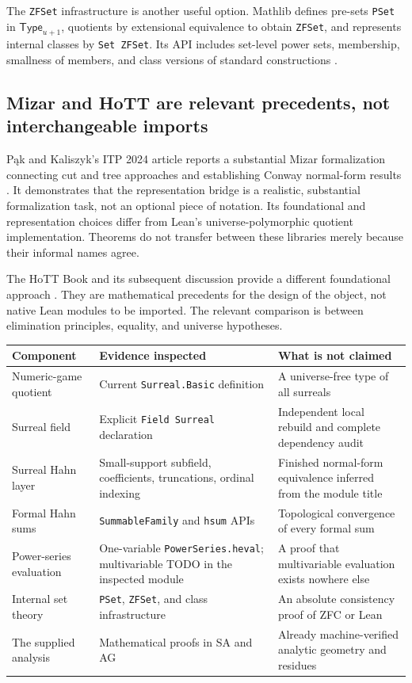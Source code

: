 \documentclass[11pt,letterpaper]{article}
\theoremstyle{definition}
\theoremstyle{remark}
\newcommand{\Type}{\mathsf{Type}}
\numberwithin{equation}{section}
\begin{document}
The \texttt{ZFSet} infrastructure is another useful option. Mathlib defines pre-sets \texttt{PSet} in \(\Type_{u+1}\), quotients by extensional equivalence to obtain \texttt{ZFSet}, and represents internal classes by \texttt{Set ZFSet}. Its API includes set-level power sets, membership, smallness of members, and class versions of standard constructions \cite{MathlibPSet,MathlibZF,MathlibClass}.

\subsection{Mizar and HoTT are relevant precedents, not interchangeable imports}
P\k{a}k and Kaliszyk's ITP 2024 article reports a substantial Mizar formalization connecting cut and tree approaches and establishing Conway normal-form results \cite{PakKaliszyk}. It demonstrates that the representation bridge is a realistic, substantial formalization task, not an optional piece of notation. Its foundational and representation choices differ from Lean's universe-polymorphic quotient implementation. Theorems do not transfer between these libraries merely because their informal names agree.

The HoTT Book and its subsequent discussion provide a different foundational approach \cite{HoTTBook,ShulmanPlump}. They are mathematical precedents for the design of the object, not native Lean modules to be imported. The relevant comparison is between elimination principles, equality, and universe hypotheses.

\begin{longtable}{@{}L{0.29\textwidth}L{0.32\textwidth}L{0.31\textwidth}@{}}
\toprule
Component & Evidence inspected & What is not claimed\\
\midrule\endhead
Numeric-game quotient & Current \texttt{Surreal.Basic} definition & A universe-free type of all surreals\\[0.35em]
Surreal field & Explicit \texttt{Field Surreal} declaration & Independent local rebuild and complete dependency audit\\[0.35em]
Surreal Hahn layer & Small-support subfield, coefficients, truncations, ordinal indexing & Finished normal-form equivalence inferred from the module title\\[0.35em]
Formal Hahn sums & \texttt{SummableFamily} and \texttt{hsum} APIs & Topological convergence of every formal sum\\[0.35em]
Power-series evaluation & One-variable \texttt{PowerSeries.heval}; multivariable TODO in the inspected module & A proof that multivariable evaluation exists nowhere else\\[0.35em]
Internal set theory & \texttt{PSet}, \texttt{ZFSet}, and class infrastructure & An absolute consistency proof of ZFC or Lean\\[0.35em]
The supplied analysis & Mathematical proofs in SA and AG & Already machine-verified analytic geometry and residues\\
\bottomrule
\end{longtable}
\end{document}
